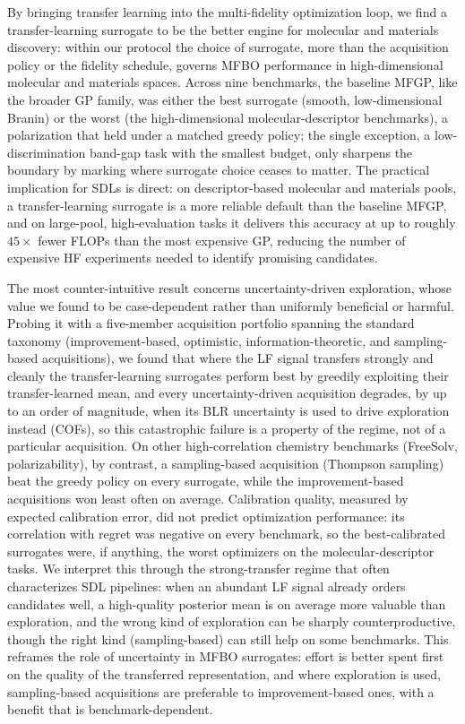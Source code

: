 \documentclass[11pt,a4paper]{article}%
\begin{document}
By bringing transfer learning into the multi-fidelity optimization loop, we find a
transfer-learning surrogate to be the better engine for molecular and materials
discovery: within our protocol the choice of surrogate, more than the acquisition policy or
the fidelity schedule, governs MFBO performance in
high-dimensional molecular and materials spaces.
Across nine benchmarks, the baseline MFGP, like the broader GP family, was
either the best surrogate (smooth, low-dimensional Branin) or the worst (the
high-dimensional molecular-descriptor benchmarks), a polarization that held under a
matched greedy policy; the single exception, a low-discrimination band-gap
task with the smallest budget, only sharpens the boundary by marking where surrogate
choice ceases to matter. The practical implication for SDLs is
direct: on descriptor-based molecular and materials pools, a transfer-learning
surrogate is a more reliable default than the baseline MFGP, and on large-pool,
high-evaluation tasks it delivers this accuracy at up to roughly $45\times$ fewer FLOPs than the most expensive GP, reducing the number of expensive HF experiments needed to identify
promising candidates.

The most counter-intuitive result concerns uncertainty-driven exploration, whose value we
found to be case-dependent rather than uniformly beneficial or harmful. Probing it with a
five-member acquisition portfolio spanning the standard taxonomy (improvement-based,
optimistic, information-theoretic, and sampling-based acquisitions), we found that where the
LF signal transfers strongly and cleanly the transfer-learning surrogates perform best by
greedily exploiting their transfer-learned mean, and every uncertainty-driven acquisition
degrades, by up to an order of magnitude, when its BLR uncertainty is used
to drive exploration instead (COFs), so this catastrophic failure is a property of the
regime, not of a particular acquisition. On other high-correlation chemistry benchmarks
(FreeSolv, polarizability), by contrast, a sampling-based acquisition (Thompson sampling) beat the
greedy policy on every surrogate, while the improvement-based acquisitions won least often on average.
Calibration quality, measured by expected calibration error, did not predict
optimization performance: its correlation with regret was negative on every benchmark, so the
best-calibrated surrogates were, if anything, the worst
optimizers on the molecular-descriptor tasks. We interpret this through the strong-transfer regime
that often characterizes SDL pipelines: when an abundant LF signal already orders
candidates well, a high-quality posterior mean is on average more valuable than
exploration, and the wrong kind of exploration can be sharply counterproductive, though the
right kind (sampling-based) can still help on some benchmarks. This reframes the role of
uncertainty in MFBO surrogates: effort is better spent first on the quality of the
transferred representation, and where exploration is used, sampling-based acquisitions are
preferable to improvement-based ones, with a benefit that is benchmark-dependent.
\end{document}
